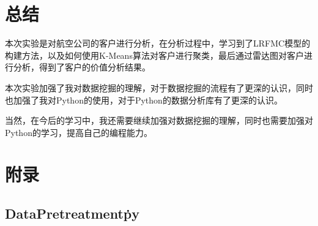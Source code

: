 \documentclass[UTF8,12pt]{article}
\begin{document}
\section{总结}
本次实验是对航空公司的客户进行分析，在分析过程中，学习到了LRFMC模型的构建方法，以及如何使用K-Means算法对客户进行聚类，最后通过雷达图对客户进行分析，得到了客户的价值分析结果。

本次实验加强了我对数据挖掘的理解，对于数据挖掘的流程有了更深的认识，同时也加强了我对Python的使用，对于Python的数据分析库有了更深的认识。

当然，在今后的学习中，我还需要继续加强对数据挖掘的理解，同时也需要加强对Python的学习，提高自己的编程能力。

\section{附录}

\subsection{DataPretreatment\.py}
\end{document}
